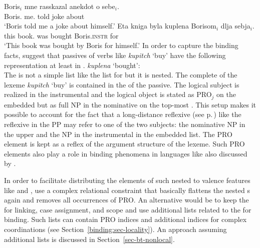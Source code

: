 \documentclass[output=paper,biblatex,babelshorthands,newtxmath,draftmode,colorlinks,citecolor=brown]{langscibook}
\begin{document}
\eal
\label{binding:russian-pass}
\ex  
\gll Boris$_i$    mne      rasskazal anekdot o sebe$_i$.\\
     Boris.\nom{} me.\dat{} told      joke    about \self\\
\glt `Boris told me a joke about himself.'
\ex
\gll Eta kniga byla kuplena Borisom$_{i}$ dlja sebja$_{i}$.  \\
     this book.\nom{} was bought Boris.\textsc{instr} for \self  \\
\glt `This book was bought by Boris for himself.'
\zl
In order to capture the binding facts, \citet{MS98a} suggest that passives of verbs like
\emph{kupitch} `buy' have the following representation at least in .
\ea
\emph{kuplena} `bought':\\
\z
The \argstl is not a simple list like the list for  but it is nested. The complete \argstl of
the lexeme \emph{kupitch} `buy' is contained in the \argstl of the passive. The logical subject is
realized in the instrumental and the logical object is stated as PRO$_j$ on the embedded \argst but
as full NP in the nominative on the top-most \argstl. This setup makes it possible to account for
the fact that a long-distance reflexive (see p.\,\pageref{page-long-distance-reflexives}) like the
reflexive in the PP may refer to one of the two subjects: the nominative NP in the upper \argstl and
the NP in the instrumental in the embedded list. The PRO element is kept as a reflex of the
argument structure of the lexeme. Such PRO elements also play a role in binding phenomena in languages
like  also discussed by \citeauthor{MS98a}.

In order to facilitate distributing the elements of such nested \argstls to valence features like
\subj and \comps, \citet[, 140]{MS98a} use a complex relational constraint that basically flattens the
nested \argst{}s again and removes all occurrences of PRO. An alternative would be to keep the
\argstl for linking, case assignment, and scope and use additional lists related to the \argstl for
binding. Such lists can contain PRO indices and additional indices for complex coordinations (see
Section~\ref{binding:sec-locality}). An approach assuming additional lists is discussed in Section~\ref{sec-bt-nonlocal}.
\end{document}
